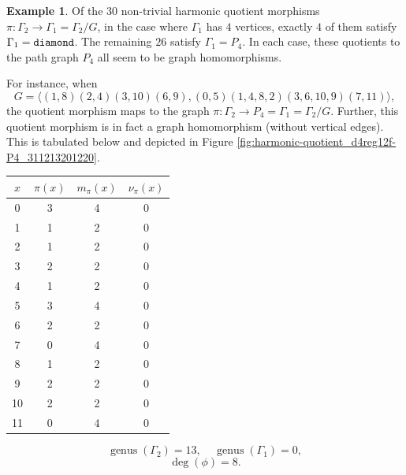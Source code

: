 \documentclass[12pt,letterpaper]{article}
\theoremstyle{definition}
\newtheorem{example}[theorem]{Example}
\DeclareMathOperator{\genus}{genus}
\begin{document}
\begin{example}
{Of the $30$ non-trivial harmonic quotient morphisms
$\pi: \Gamma_2\to \Gamma_1=\Gamma_2/G$, in the case where
$\Gamma_1$ has $4$ vertices, exactly $4$ of them
satisfy $\Gamma_1={\tt diamond}$.
The remaining $26$ satisfy $\Gamma_1=P_4$.
In each case, these quotients to the path graph $P_4$ all seem
to be graph homomorphisms.


For instance, when
\[
G = \langle (1,8)(2,4)(3,10)(6,9), (0,5)(1,4,8,2)(3,6,10,9)(7,11) \rangle ,
\]
the quotient morphism maps to the graph
$\pi: \Gamma_2\to P_4=\Gamma_1=\Gamma_2/G $.
Further, this quotient morphism is in fact a graph homomorphism
(without vertical edges).
This is tabulated below and depicted in
Figure \ref{fig:harmonic-quotient_d4reg12f-P4_311213201220}.

\begin{center}
\begin{tabular}{c|c|c|c}  
  $x$ & $\pi(x)$ & $m_\pi(x)$ & $\nu_\pi(x)$   \\ \hline
  0   &    3   &        4         &  0  \\ 
  1   &    1   &        2         &  0  \\ 
  2   &    1   &        2         &  0  \\ 
  3   &    2   &        2         &  0   \\
  4   &    1   &        2         &  0   \\
  5   &    3   &        4         &  0   \\
  6   &    2   &        2         &  0   \\
  7   &    0   &        4         &  0   \\
  8   &    1   &        2         &  0   \\
  9   &    2   &        2         &  0  \\   
  10  &    2  &         2         &  0  \\
  11  &    0   &        4         &  0  \\  
\end{tabular}
\end{center}

\[
  \genus(\Gamma_2) =13,\ \ \ \ \
  \genus(\Gamma_1) =0,
\]
\[
\deg(\phi) =8.
\]

}
\end{example}
\end{document}

